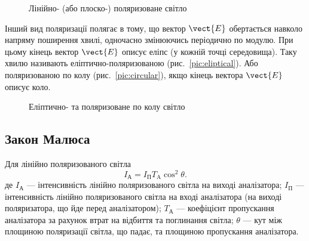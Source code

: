 \begin{figure}[h!]\centering
\begin{minipage}{0.45\linewidth}\centering

\caption{Лінійно- (або плоско-) поляризоване світло}
\label{pic:linear}
\end{minipage}
\begin{minipage}{0.45\linewidth}\centering

\label{pic:unpolarised}
\end{minipage}
\end{figure}

Інший вид поляризації полягає в тому, що вектор $ \vect{E} $
обертається навколо напряму поширення хвилі, одночасно змінюючись періодично по модулю. При цьому кінець
вектор $ \vect{E} $ описує еліпс (у кожній точці середовища). Таку
хвилю називають еліптично-поляризованою (рис.~\ref{pic:eliptical}). Або поляризованою по колу (рис.~\ref{pic:circular}), якщо кінець вектора $ \vect{E} $ описує коло.


\begin{figure}[h!]\centering
    
\caption{Еліптично- та поляризоване по колу світло}
\label{pic:eliptical_polarisation}
\end{figure}





\subsection*{Закон Малюса}


Для лінійно поляризованого світла
\begin{equation}\label{eq:Malus_law_for_linear}
    I_\text{А} = I_\text{П}T_\text{A}\cos^2\theta.
\end{equation}
де  $ I_\text{А} $ --- інтенсивність лінійно поляризованого світла на виході аналізатора; $ I_\text{П} $ --- інтенсивність лінійно поляризованого світла на вході аналізатора (на виході поляризатора, що йде перед аналізатором); $ T_\text{А} $ --- коефіцієнт пропускання аналізатора за рахунок втрат на відбиття та поглинання світла; $\theta$ --- кут між площиною поляризації світла, що падає, та площиною пропускання аналізатора.

